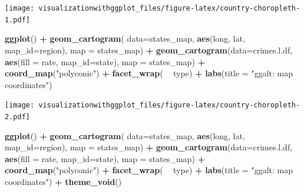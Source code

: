 \documentclass[]{krantz}
\makeatletter
\newenvironment{Shaded}{\begin{snugshade}}{\end{snugshade}}
\newcommand{\KeywordTok}[1]{\textcolor[rgb]{0.13,0.29,0.53}{\textbf{#1}}}
\newcommand{\DataTypeTok}[1]{\textcolor[rgb]{0.13,0.29,0.53}{#1}}
\newcommand{\StringTok}[1]{\textcolor[rgb]{0.31,0.60,0.02}{#1}}
\newcommand{\OperatorTok}[1]{\textcolor[rgb]{0.81,0.36,0.00}{\textbf{#1}}}
\newcommand{\NormalTok}[1]{#1}
\newenvironment{kframe}{%
\medskip{}
\setlength{\fboxsep}{.8em}
 \def\at@end@of@kframe{}%
 \ifinner\ifhmode%
  \def\at@end@of@kframe{\end{minipage}}%
  \begin{minipage}{\columnwidth}%
 \fi\fi%
 \def\FrameCommand##1{\hskip\@totalleftmargin \hskip-\fboxsep
 \colorbox{shadecolor}{##1}\hskip-\fboxsep
     \hskip-\linewidth \hskip-\@totalleftmargin \hskip\columnwidth}%
 \MakeFramed {\advance\hsize-\width
   \@totalleftmargin\z@ \linewidth\hsize
   \@setminipage}}%
 {\par\unskip\endMakeFramed%
 \at@end@of@kframe}
\renewenvironment{Shaded}{\begin{kframe}}{\end{kframe}}
\theoremstyle{definition}
\theoremstyle{definition}
\theoremstyle{definition}
\theoremstyle{remark}
\makeatother
\begin{document}
\texttt{[image: visualizationwithggplot\_files/figure-latex/country-choropleth-1.pdf]}

\begin{Shaded}
\begin{Highlighting}[]
\KeywordTok{ggplot}\NormalTok{() }\OperatorTok{+}
\StringTok{    }\KeywordTok{geom_cartogram}\NormalTok{( }\DataTypeTok{data=}\NormalTok{states_map, }\KeywordTok{aes}\NormalTok{(long, lat, }\DataTypeTok{map_id=}\NormalTok{region), }\DataTypeTok{map =}\NormalTok{ states_map) }\OperatorTok{+}
\StringTok{    }\KeywordTok{geom_cartogram}\NormalTok{(}\DataTypeTok{data=}\NormalTok{crimes.l.df, }\KeywordTok{aes}\NormalTok{(}\DataTypeTok{fill =}\NormalTok{ rate, }\DataTypeTok{map_id=}\NormalTok{state), }\DataTypeTok{map =}\NormalTok{ states_map) }\OperatorTok{+}
\StringTok{    }\KeywordTok{coord_map}\NormalTok{(}\StringTok{"polyconic"}\NormalTok{) }\OperatorTok{+}
\StringTok{    }\KeywordTok{facet_wrap}\NormalTok{( }\OperatorTok{~}\StringTok{ }\NormalTok{type) }\OperatorTok{+}
\StringTok{    }\KeywordTok{labs}\NormalTok{(}\DataTypeTok{title =} \StringTok{"ggalt: map coordinates"}\NormalTok{)}
\end{Highlighting}
\end{Shaded}

\texttt{[image: visualizationwithggplot\_files/figure-latex/country-choropleth-2.pdf]}

\begin{Shaded}
\begin{Highlighting}[]
\KeywordTok{ggplot}\NormalTok{() }\OperatorTok{+}
\StringTok{    }\KeywordTok{geom_cartogram}\NormalTok{( }\DataTypeTok{data=}\NormalTok{states_map, }\KeywordTok{aes}\NormalTok{(long, lat, }\DataTypeTok{map_id=}\NormalTok{region), }\DataTypeTok{map =}\NormalTok{ states_map) }\OperatorTok{+}
\StringTok{    }\KeywordTok{geom_cartogram}\NormalTok{(}\DataTypeTok{data=}\NormalTok{crimes.l.df, }\KeywordTok{aes}\NormalTok{(}\DataTypeTok{fill =}\NormalTok{ rate, }\DataTypeTok{map_id=}\NormalTok{state), }\DataTypeTok{map =}\NormalTok{ states_map) }\OperatorTok{+}
\StringTok{    }\KeywordTok{coord_map}\NormalTok{(}\StringTok{"polyconic"}\NormalTok{) }\OperatorTok{+}
\StringTok{    }\KeywordTok{facet_wrap}\NormalTok{( }\OperatorTok{~}\StringTok{ }\NormalTok{type) }\OperatorTok{+}
\StringTok{    }\KeywordTok{labs}\NormalTok{(}\DataTypeTok{title =} \StringTok{"ggalt: map coordinates"}\NormalTok{) }\OperatorTok{+}
\StringTok{    }\KeywordTok{theme_void}\NormalTok{()}
\end{Highlighting}
\end{Shaded}
\end{document}
